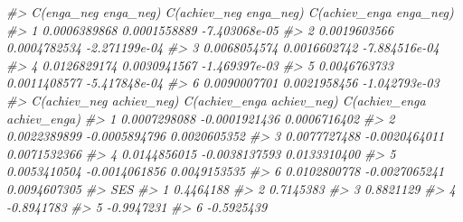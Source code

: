 \documentclass[
]{book}
\newenvironment{Shaded}{\begin{snugshade}}{\end{snugshade}}
\newcommand{\CommentTok}[1]{\textcolor[rgb]{0.56,0.35,0.01}{\textit{#1}}}
\begin{document}
\begin{Shaded}
\begin{Highlighting}[]
\CommentTok{\#\textgreater{}   C(enga\_neg enga\_neg) C(achiev\_neg enga\_neg) C(achiev\_enga enga\_neg)}
\CommentTok{\#\textgreater{} 1         0.0006389868           0.0001558889           {-}7.403068e{-}05}
\CommentTok{\#\textgreater{} 2         0.0019603566           0.0004782534           {-}2.271199e{-}04}
\CommentTok{\#\textgreater{} 3         0.0068054574           0.0016602742           {-}7.884516e{-}04}
\CommentTok{\#\textgreater{} 4         0.0126829174           0.0030941567           {-}1.469397e{-}03}
\CommentTok{\#\textgreater{} 5         0.0046763733           0.0011408577           {-}5.417848e{-}04}
\CommentTok{\#\textgreater{} 6         0.0090007701           0.0021958456           {-}1.042793e{-}03}
\CommentTok{\#\textgreater{}   C(achiev\_neg achiev\_neg) C(achiev\_enga achiev\_neg) C(achiev\_enga achiev\_enga)}
\CommentTok{\#\textgreater{} 1             0.0007298088             {-}0.0001921436               0.0006716402}
\CommentTok{\#\textgreater{} 2             0.0022389899             {-}0.0005894796               0.0020605352}
\CommentTok{\#\textgreater{} 3             0.0077727488             {-}0.0020464011               0.0071532366}
\CommentTok{\#\textgreater{} 4             0.0144856015             {-}0.0038137593               0.0133310400}
\CommentTok{\#\textgreater{} 5             0.0053410504             {-}0.0014061856               0.0049153535}
\CommentTok{\#\textgreater{} 6             0.0102800778             {-}0.0027065241               0.0094607305}
\CommentTok{\#\textgreater{}          SES}
\CommentTok{\#\textgreater{} 1  0.4464188}
\CommentTok{\#\textgreater{} 2  0.7145383}
\CommentTok{\#\textgreater{} 3  0.8821129}
\CommentTok{\#\textgreater{} 4 {-}0.8941783}
\CommentTok{\#\textgreater{} 5 {-}0.9947231}
\CommentTok{\#\textgreater{} 6 {-}0.5925439}
\end{Highlighting}
\end{Shaded}
\end{document}
